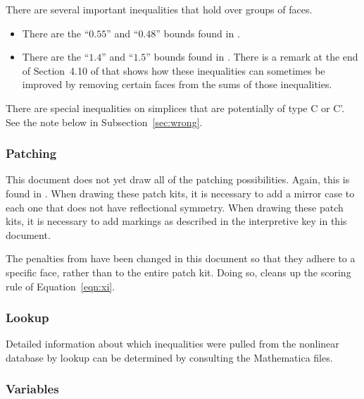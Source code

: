There are several important inequalities that hold over groups of
faces.

\begin{itemize}
  \item There are the ``$0.55$'' and ``$0.48$'' bounds found in
  \cite[Lemma 10.6,p.101]{DCG}.
  \item There are the ``$1.4$'' and ``$1.5$'' bounds found in
  \cite[Lemma~22.12,p.233]{DCG}.  There is a remark at the end of
  Section~4.10 of \cite[VI,p.37]{KEP98} that shows how these
  inequalities can sometimes be improved by removing certain faces
  from the sums of those inequalities.
\end{itemize}


There are special inequalities on simplices that are potentially
of type C or C'.  See the note below in
Subsection~\ref{sec:wrong}.





\subsubsection{Patching}

This document does not yet draw all of the patching possibilities.
Again, this is found in \cite[Sec.25.5--25.6,pp.249--251]{DCG}.
When drawing these patch kits, it is necessary to add a mirror
case to each one that does not have reflectional symmetry.  When
drawing these patch kits, it is necessary to add markings as
described in the interpretive key in this document.

The penalties from \cite{DCG} have been changed in this document
so that they adhere to a specific face, rather than to the entire
patch kit.  Doing so, cleans up the scoring rule of
Equation~\ref{eqn:xi}.




\subsubsection{Lookup}

Detailed information about which inequalities were pulled from the
nonlinear database by lookup can be determined by consulting the
Mathematica files.





\subsubsection{Variables}

